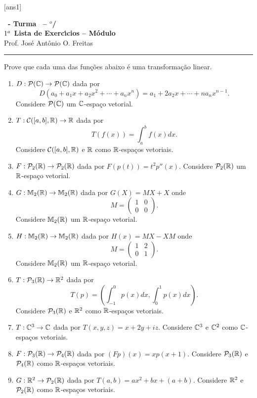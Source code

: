 \documentclass[12pt]{exam}
\begin{document}
  [ans1]
  \begin{center}
    {\Large\bf \disciplina\ - Turma \turma\ -- \semestre$^{o}$/\ano} \\ \vspace{9pt} {\large\bf
        $1^a$ Lista de Exerc{\'\i}cios -- Módulo \numeromodulo}\\ \vspace{9pt} Prof. Jos{\'e} Ant{\^o}nio O. Freitas
  \end{center}
  \hrule


\begin{exercicio}
	Prove que cada uma das fun\c{c}\~oes abaixo \'e uma transforma\c{c}\~ao linear.
	\begin{enumerate}[label=({\alph*})]
		\item $D : \mathcal{P}(\mathbb{C}) \to \mathcal{P}(\mathbb{C})$ dada por
		\[
		D(a_0 + a_1x + a_2x^2 + \cdots + a_nx^n) = a_1 + 2a_2x + \cdots + na_nx^{n - 1}.
		\]
		Considere $\mathcal{P}(\mathbb{C})$ um $\mathbb{C}$-espa\c{c}o vetorial.
		\item $T : \mathcal{C}([a,b], \mathbb{R}) \to \mathbb{R}$ dada por
		\[
		T(f(x)) = \int_a^bf(x)dx.
		\]
		Considere $\mathcal{C}([a,b], \mathbb{R})$ e $\mathbb{R}$ como $\mathbb{R}$-espa\c{c}os vetoriais.
		\item $F : \mathcal{P}_2(\mathbb{R}) \to \mathcal{P}_2(\mathbb{R})$ dada por $F(p(t)) = t^2p''(x)$. Considere $\mathcal{P}_2(\mathbb{R})$ um $\mathbb{R}$-espa\c{c}o vetorial.
		\item $G : \mathbb{M}_2(\mathbb{R}) \to \mathbb{M}_2(\mathbb{R})$ dada por $G(X) = MX + X$ onde
		\[
		M = \begin{pmatrix}
			1 & 0\\
			0 & 0
		\end{pmatrix}.
		\]
		Considere $\mathbb{M}_2(\mathbb{R})$ um $\mathbb{R}$-espa\c{c}o vetorial.
		\item $H : \mathbb{M}_2(\mathbb{R}) \to \mathbb{M}_2(\mathbb{R})$ dada por $H(x) = MX - XM$ onde
		\[
		M = \begin{pmatrix}
			1 & 2\\
			0 & 1
		\end{pmatrix}.
		\]
		Considere $\mathbb{M}_2(\mathbb{R})$ um $\mathbb{R}$-espa\c{c}o vetorial.
		\item $T : \mathcal{P}_3(\mathbb{R}) \to \mathbb{R}^2$ dada por
		\[
		T(p) = \left(\int_{-1}^0p(x)dx, \int_0^1p(x)dx\right).
		\]
		Considere $\mathcal{P}_3(\mathbb{R})$ e $\mathbb{R}^2$ como $\mathbb{R}$-espa\c{c}os vetoriais.
		\item $T : \mathbb{C}^3 \to \mathbb{C}$ dada por $T(x,y,z) = x + 2y + iz$. Considere $\mathbb{C}^3$ e $\mathbb{C}^2$ como $\mathbb{C}$-espa\c{c}os vetoriais.
		\item $F : \mathcal{P}_3(\mathbb{R}) \to \mathcal{P}_4(\mathbb{R})$ dada por $(Fp)(x) = xp(x + 1)$. Considere $\mathcal{P}_3(\mathbb{R})$ e $\mathcal{P}_4(\mathbb{R})$ como $\mathbb{R}$-espa\c{c}os vetoriais.
		\item $G : \mathbb{R}^2 \to \mathcal{P}_2(\mathbb{R})$ dada por $T(a,b) = ax^2 + bx + (a + b)$. Considere $\mathbb{R}^2$ e $\mathcal{P}_2(\mathbb{R})$ como $\mathbb{R}$-espa\c{c}os vetoriais.
	\end{enumerate}
\end{exercicio}
\end{document}
